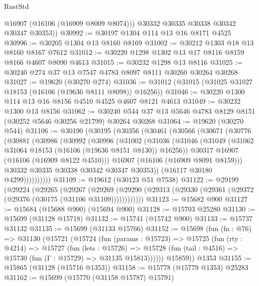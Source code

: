 \begin{lexlean}{RustStd}
\begin{coremodule}
          @16907
          (@16106 (@16909 @8009 @8074)))
        @30332
        @30335
        @30338
        @30342
        @30347
        @30353))
@30992 := @30197 @1304 @114 @13 @16 @8171 @4525
@30996 := @30205 @1304 @13 @8160 @8169
@31002 := @30212 @1303 @18 @13 @8160 @8167 @7612
@31012 := @30220 @1298 @1302 @13 @17 @8116 @8159 @8166 @4607 @8090 @4613
@31015 := @30232 @1298 @13 @8116
@31025 := @30240 @274 @37 @13 @7547 @4783 @8097 @8111 @30260 @30264 @30268
@31027 := @19620 (@30270 @274)
@31036 := @31012 (@31015 (@31025 @31027 @18153 (@16106 (@19636 @8111 @8098)) @16256))
@31046 := @30220 @1300 @114 @13 @16 @8156 @4510 @4525 @4607 @8121 @4613
@31049 := @30232 @1300 @13 @8156
@31062 := @30240 @544 @37 @13 @5646 @4783 @8129 @8151 (@30252 @5646 @30256 @21799) @30264 @30268
@31064 := @19620 (@30270 @544)
@31106 := @30190
    (@30195
      (@30356
        (@30461
          (@30566
            (@30671
              (@30776
                (@30881
                  (@30986
                    (@30992
                      (@30996
                        (@31002
                          (@31036
                            (@31046
                              (@31049 (@31062 @31064 @18153 (@16106 (@19636 @8151 @8130)) @16256))
                              @30317
                              @16907
                              (@16106 (@16909 @8122 @4510)))
                            @16907
                            (@16106 (@16909 @8091 @8159)))
                          @30332
                          @30335
                          @30338
                          @30342
                          @30347
                          @30353))
                      (@16117 @30180 @4299))))))))))
@31109 := @19612 (@30123 @51 @7538)
@31122 := @29199
    (@29224
      (@29265
        (@29267
          (@29269 (@29290 (@29313 (@29330 (@29361 (@29372 (@29376 (@30175 (@31106 @31109))))))))))))
@31123 := @15682 @900
@31127 := @15684 (@15688 @900) (@15694 @900)
@31128 := @15703 @25280
@31130 := @15699 (@31128 @15718)
@31132 := @15741 (@15742 @900)
@31133 := @15737 @31132
@31135 := @15699 (@31133 @15766)
@31152 := @15698
    (fun (fn : @76) =>
    @31130
      (@15721
        (@15724
          (fun (params : @15723) =>
          @15725
            (fun (rty : @4214) =>
            @15727
              (fun (lets : @15726) =>
              @15728 (fun (tail : @4516) => @15730 (fun (Γ : @15729) => @31135 @15813))))))
        @15859))
    @1353
@31155 := @15865 (@31128 (@15716 @1353))
@31158 := @15778 (@15779 @1353) @25283
@31162 := @15699 (@15770 (@31158 @15787) @15791)

\end{coremodule}
\end{lexlean}
